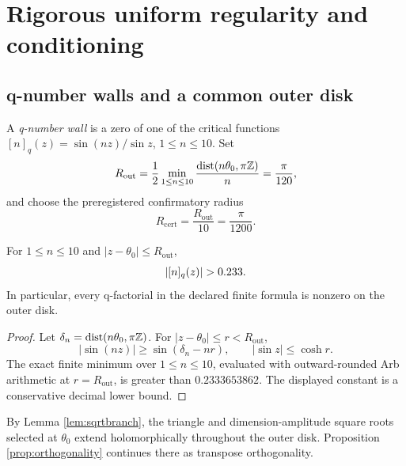 \section{Rigorous uniform regularity and conditioning}
\label{sec:conditioning}
\subsection{q-number walls and a common outer disk}
A \emph{q-number wall} is a zero of one of the critical functions $[n]_q(z)=\sin(nz)/\sin z$, $1\le n\le10$.  Set
\begin{equation}
R_{\mathrm{out}}
=\frac12\min_{1\le n\le10}
\frac{\operatorname{dist}(n\theta_0,\pi\mathbb Z)}{n}
=\frac{\pi}{120},
\label{eq:Rout}
\end{equation}
and choose the preregistered confirmatory radius
\begin{equation}
R_{\mathrm{cert}}=\frac{R_{\mathrm{out}}}{10}=\frac{\pi}{1200}.
\label{eq:Rcert}
\end{equation}

\begin{lemma}
\label{lem:qseparation}
For $1\le n\le10$ and $|z-\theta_0|\le R_{\mathrm{out}}$,
\begin{equation}
|\qnum{n}(z)|>0.233.
\label{eq:qbound}
\end{equation}
In particular, every q-factorial in the declared finite formula is nonzero on the outer disk.
\end{lemma}

\begin{proof}
Let $\delta_n=\operatorname{dist}(n\theta_0,\pi\mathbb Z)$.  For $|z-\theta_0|\le r<R_{\mathrm{out}}$,
\[
|\sin(nz)|\ge\sin(\delta_n-nr),
\qquad
|\sin z|\le\cosh r.
\]
The exact finite minimum over $1\le n\le10$, evaluated with outward-rounded Arb arithmetic at $r=R_{\mathrm{out}}$, is greater than $0.2333653862$.  The displayed constant is a conservative decimal lower bound.
\end{proof}

By Lemma \ref{lem:sqrtbranch}, the triangle and dimension-amplitude square roots selected at $\theta_0$ extend holomorphically throughout the outer disk.  Proposition \ref{prop:orthogonality} continues there as transpose orthogonality.


